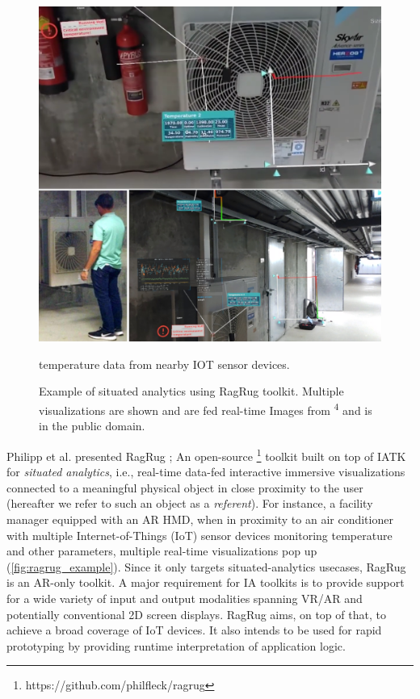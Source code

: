 \documentclass{vgtc}                          %
\begin{document}
\begin{figure}[tb]
	\centering
	\includegraphics[width=\columnwidth]{ragrug_example}
	\caption[Caption for RagRug]{Example of situated analytics using RagRug
		toolkit. Multiple visualizations are shown and are fed real-time
		Images from \textsuperscript{4} and is in the public domain. }
		temperature data from nearby IOT sensor devices.
	\label{fig:ragrug_example}
\end{figure}

Philipp et al. presented RagRug \cite{ragrug_toolkit}; An open-source
\footnote{https://github.com/philfleck/ragrug} toolkit built on top of IATK
for \textit{situated analytics}, i.e., real-time data-fed interactive immersive
visualizations connected to a meaningful physical object in close proximity to
the user (hereafter we refer to such an object as a \textit{referent}).
For instance, a facility manager equipped with an AR HMD, when in proximity to
an air conditioner with multiple Internet-of-Things (IoT)
sensor devices monitoring temperature and other parameters, multiple real-time
visualizations pop up (\autoref{fig:ragrug_example}). Since it only targets
situated-analytics usecases, RagRug is an AR-only toolkit.
A major requirement for IA toolkits is to provide support for a wide variety of
input and output modalities spanning VR/AR and potentially conventional 2D
screen displays. RagRug aims, on top of that, to achieve a broad coverage of
IoT devices. It also intends to be used for rapid prototyping by providing
runtime interpretation of application logic.
\end{document}
